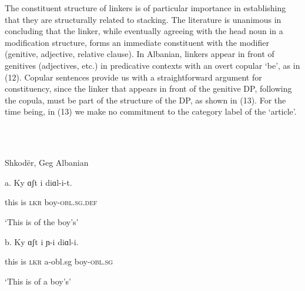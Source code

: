 \documentclass[output=paper]{langsci/langscibook}
\begin{document}
\begin{styleSfondomedioiColorexxi}
 The constituent structure of linkers is of particular importance in establishing that they are structurally related to stacking. The literature is unanimous in concluding that the linker, while eventually agreeing with the head noun in a modification structure, forms an immediate constituent with the modifier (genitive, adjective, relative clause). In Albanian, linkers appear in front of genitives (adjectives, etc.) in predicative contexts with an overt copular ‘be’, as in (12). Copular sentences provide us with a straightforward argument for constituency, since the linker that appears in front of the genitive DP, following the copula, must be part of the structure of the DP, as shown in (13). For the time being, in (13) we make no commitment to the category label of the ‘article’.
\end{styleSfondomedioiColorexxi}

\begin{styleSfondomedioiColorexxi}
\ea%
    \label{ex:key:12}
    \gll\\
        \\
    \glt
    \z

          Shkodër, Geg Albanian
\end{styleSfondomedioiColorexxi}

\begin{styleSfondomedioiColorexxi}
a.  Ky   ɑʃt   i   diɑl-i-t.     
\end{styleSfondomedioiColorexxi}

\begin{styleSfondomedioiColorexxi}
    this  is  \textsc{lkr}  boy-\textsc{obl.sg.def}   
\end{styleSfondomedioiColorexxi}

\begin{styleSfondomedioiColorexxi}
    ‘This is of the boy’s’  
\end{styleSfondomedioiColorexxi}

\begin{styleSfondomedioiColorexxi}
  b.  Ky   ɑʃt   i  ɲ{}-i    diɑl-i.
\end{styleSfondomedioiColorexxi}

\begin{styleSfondomedioiColorexxi}
    this  is  \textsc{lkr}  a-obl.sg   boy-\textsc{obl.sg}   
\end{styleSfondomedioiColorexxi}

\begin{styleSfondomedioiColorexxi}
    ‘This is of a boy’s’ 
\end{styleSfondomedioiColorexxi}
\end{document}
